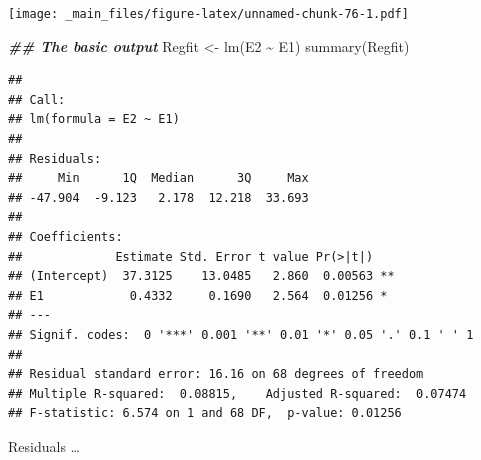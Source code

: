 \documentclass[
]{book}
\newenvironment{Shaded}{\begin{snugshade}}{\end{snugshade}}
\newcommand{\DocumentationTok}[1]{\textcolor[rgb]{0.56,0.35,0.01}{\textbf{\textit{#1}}}}
\newcommand{\FunctionTok}[1]{\textcolor[rgb]{0.00,0.00,0.00}{#1}}
\newcommand{\NormalTok}[1]{#1}
\newcommand{\OtherTok}[1]{\textcolor[rgb]{0.56,0.35,0.01}{#1}}
\newcommand{\SpecialCharTok}[1]{\textcolor[rgb]{0.00,0.00,0.00}{#1}}
\begin{document}
\texttt{[image: \_main\_files/figure-latex/unnamed-chunk-76-1.pdf]}

\begin{Shaded}
\begin{Highlighting}[]
\DocumentationTok{\#\# The basic output}
\NormalTok{Regfit }\OtherTok{\textless{}{-}} \FunctionTok{lm}\NormalTok{(E2 }\SpecialCharTok{\textasciitilde{}}\NormalTok{ E1)}
\FunctionTok{summary}\NormalTok{(Regfit)}
\end{Highlighting}
\end{Shaded}

\begin{verbatim}
## 
## Call:
## lm(formula = E2 ~ E1)
## 
## Residuals:
##     Min      1Q  Median      3Q     Max 
## -47.904  -9.123   2.178  12.218  33.693 
## 
## Coefficients:
##             Estimate Std. Error t value Pr(>|t|)   
## (Intercept)  37.3125    13.0485   2.860  0.00563 **
## E1            0.4332     0.1690   2.564  0.01256 * 
## ---
## Signif. codes:  0 '***' 0.001 '**' 0.01 '*' 0.05 '.' 0.1 ' ' 1
## 
## Residual standard error: 16.16 on 68 degrees of freedom
## Multiple R-squared:  0.08815,    Adjusted R-squared:  0.07474 
## F-statistic: 6.574 on 1 and 68 DF,  p-value: 0.01256
\end{verbatim}

Residuals \ldots{}
\end{document}

